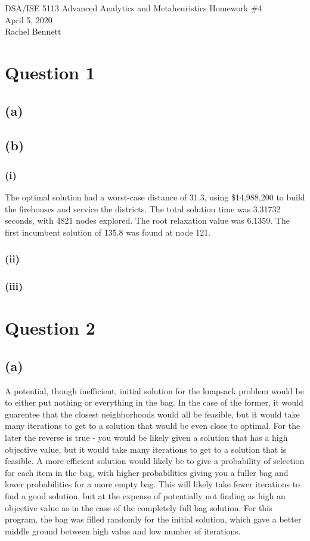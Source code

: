 \documentclass[12pt, letterpaper]{article}
\begin{document}
\begin{center}
\Large DSA/ISE 5113 Advanced Analytics and Metaheuristics
\Large Homework \#4\\
\vspace{3mm}
\normalsize April 5, 2020\\
\vspace{3mm}
\normalsize Rachel Bennett
\end{center}

\section*{Question 1}
\subsection*{(a)}
\subsection*{(b)}
\subsubsection*{(i)}
The optimal solution had a worst-case distance of 31.3, using \$14,988,200 to build the firehouses and service the districts. The total 
solution time was 3.31732 seconds, with 4821 nodes explored. The root relaxation value was 6.1359. The first incumbent solution of 135.8 was found at node 121. 
\subsubsection*{(ii)}
\subsubsection*{(iii)}
\section*{Question 2}

\subsection*{(a)}
A potential, though inefficient, initial solution for the knapsack problem would be to either put nothing or everything in the bag. In the case of the former, it would guarentee that the closest neighborhoods would all be feasible, but it would take many iterations to get to a solution that would be even close to optimal. For the later the reverse is true - you would be likely given a solution that has a high objective value, but it would take many iterations to get to a solution that is feasible. A more efficient solution would likely be to give a probability of selection for each item in the bag, with higher probabilities giving you a fuller bag and lower probabilities for a more empty bag. This will likely take fewer iterations to find a good solution, but at the expense of potentially not finding as high an objective value as in the case of the completely full bag solution. For this program, the bag was filled randomly for the initial solution, which gave a better middle ground between high value and low number of iterations.
\end{document}
